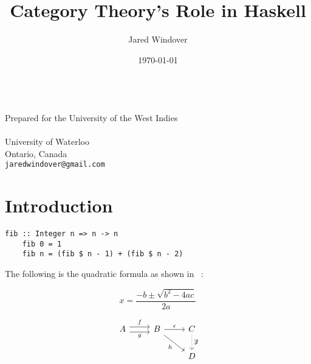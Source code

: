 \documentclass{article}
\title{Category Theory's Role in Haskell}
\author{Jared Windover}
\date{\today}
\begin{document}

\makeatletter
\begin{titlepage}
\begin{center}
{\Huge \@title}\\
{\Large Prepared for the University of the West Indies}\\[1em]
{\LARGE \@author}\\
{\large University of Waterloo\\
Ontario, Canada\\
\texttt{jaredwindover@gmail.com}}\\[0.8em]
{\Large \@date}
\end{center}
\begin{abstract}
\lipsum[1-2]
\end{abstract}
\end{titlepage}
\makeatother

\setcounter{page}{2}

\tableofcontents
\newpage


\section{Introduction}

\begin{algex}[My algorithm]
  \begin{lstlisting}[style=Hask,caption={This is an algorithm for calculating the fibonacci numbers ~\parencite{LYHGG}.}]
    fib :: Integer n => n -> n
    fib 0 = 1
    fib n = (fib $ n - 1) + (fib $ n - 2)
  \end{lstlisting}
\end{algex} 
The following is the quadratic formula as shown in ~\parencite{RWH}:
\begin{ex}
  \begin{equation}
    x = \frac{-b \pm \sqrt{b^2 - 4ac}}{2a}
  \end{equation}
\end{ex}

\begin{ex}
  \begin{equation}
    \begin{tikzcd}
      A \arrow[yshift=.7ex,r,"f"]
      \arrow[yshift=-.7ex,r,swap,"g"]
      &
      B \arrow[r,"\ep"]
      \arrow[dr,swap,"h"]
      &
      C \arrow[densely dotted,d,"\not\exists"]
      \\
      & &
      D
    \end{tikzcd}
  \end{equation}
\end{ex}
\end{document}
